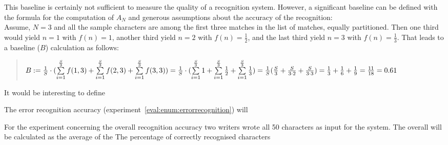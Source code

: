 This baseline is certainly not sufficient to measure the quality of a 
recognition system. However, a significant baseline can be defined 
with the formula for the computation of \(A_N\) and generous assumptions
about the accuracy of the recognition: \\
Assume, \(N = 3\) and all the sample characters are among the first three 
matches in the list of matches, equally partitioned.
Then one third would yield \(n = 1\) with \(f(n) = 1\),
another third yield \(n = 2\) with \(f(n) = \frac{1}{2}\),
and the last third yield \(n = 3\) with \(f(n) = \frac{1}{3}\).
That leads to a baseline (\(B\)) calculation as follows:
\begin{quote}
  \(
    B := \frac{1}{S} \cdot (\sum\limits_{i=1}^{\frac{S}{3}}{f(1,3)} + \sum\limits_{i=1}^{\frac{S}{3}}{f(2,3)} + \sum\limits_{i=1}^{\frac{S}{3}}{f(3,3)}) \\
       = \frac{1}{S} \cdot (\sum\limits_{i=1}^{\frac{S}{3}}{1} + \sum\limits_{i=1}^{\frac{S}{3}}{\frac{1}{2}} + \sum\limits_{i=1}^{\frac{S}{3}}{\frac{1}{3}}) \\
       = \frac{1}{S} (\frac{S}{3} + \frac{S}{3 \cdot 2} + \frac{S}{3 \cdot 3}) 
       = \frac{1}{3} + \frac{1}{6} + \frac{1}{9}
       = \frac{11}{18} = 0.61
  \)
\end{quote}

It would be interesting to define

The error recognition accuracy (experiment~\ref{eval:enum:errorrecognition}) 
will 

        For the experiment concerning the overall recognition accuracy 
        two writers wrote all 50 characters as input for the system.
        The overall will be calculated as the average of the 
        The percentage of correctly recognised characters






